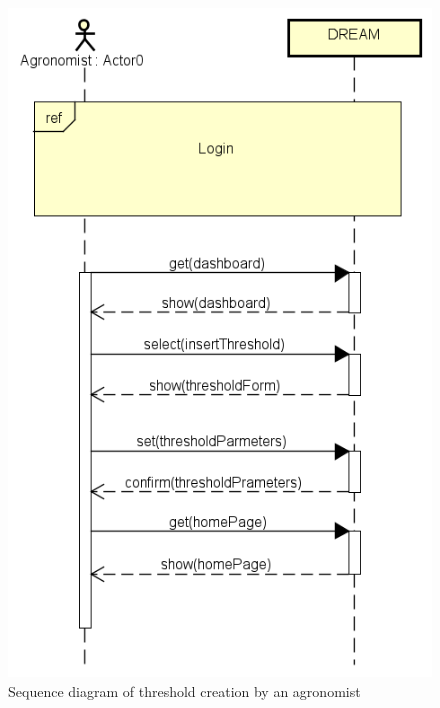 \bigskip
\begin{figure}[H]
    \centering
    \includegraphics[scale=0.7]{Images/agronomistCreatesThreshold.png}
    \caption{Sequence diagram of threshold creation by an agronomist}
\end{figure}

